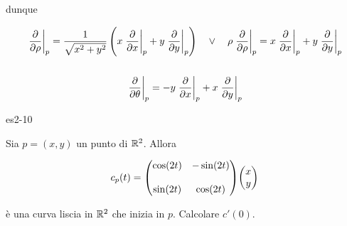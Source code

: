 {dunque

\begin{gather}
	\eval{\pdv{\rho}}_{p} = \dfrac{1}{\sqrt{x^{2} + y^{2}}} \left( x \eval{\pdv{x}}_{p} + y \eval{\pdv{y}}_{p} \right) %
	\quad \lor \quad %
	\rho \eval{\pdv{\rho}}_{p} = x \eval{\pdv{x}}_{p} + y \eval{\pdv{y}}_{p} \\
	\nonumber \\
	\eval{\pdv{\theta}}_{p} = - y \eval{\pdv{x}}_{p} + x \eval{\pdv{y}}_{p}
\end{gather}
}


{es2-10}
{
Sia $ p = (x,y) $ un punto di $ \mathbb{R}^{2} $. Allora

\begin{equation}
	c_{p}(t) = \mqty( \cos(2t) & -\sin(2t) \\ \\ \sin(2t) & \cos(2t) ) \mqty(x \\ y)
\end{equation}

è una curva liscia in $ \mathbb{R}^{2} $ che inizia in $ p $. Calcolare $ c'(0) $.
}
